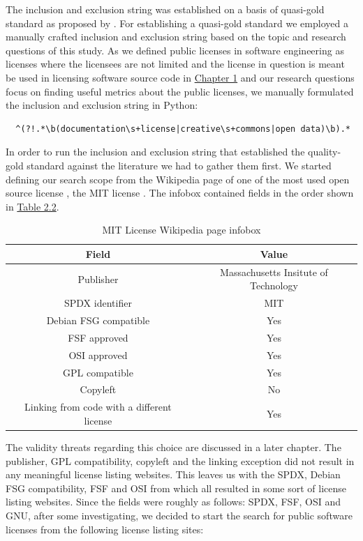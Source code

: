 The inclusion and exclusion string was established on a basis of quasi-gold standard as proposed by \cite{qgs}. For establishing a quasi-gold standard we employed a manually crafted inclusion and exclusion string based on the topic and research questions of this study. As we defined public licenses in software engineering as licenses where the licensees are not limited and the license in question is meant be used in licensing software source code in \hyperref[intro]{Chapter 1} and our research questions focus on finding useful metrics about the public licenses, we manually formulated the inclusion and exclusion string in Python:
\begin{verbatim}
  ^(?!.*\b(documentation\s+license|creative\s+commons|open data)\b).*
\end{verbatim}
In order to run the inclusion and exclusion string that established the quality-gold standard against the literature we had to gather them first. We started defining our search scope from the Wikipedia page of one of the most used open source license \citep{github:licenseusage}, the MIT license \citep{wikipedia:mit}. The infobox contained fields in the order shown in \hyperref[table:infobox]{Table 2.2}.

\begin{table}[t]
  \caption{MIT License Wikipedia page infobox}
	\begin{center}
		\begin{tabular}{||c c||}
			\hline
			Field & Value \\
			\hline
			Publisher & Massachusetts Insitute of Technology \\
			SPDX identifier & MIT \\
			Debian FSG compatible & Yes \\
			FSF approved & Yes \\
			OSI approved & 	Yes \\
			GPL compatible & Yes \\
			Copyleft & No \\
			Linking from code with a different license & Yes \\
			\hline
		\end{tabular}
		\label{table:infobox}
	\end{center}
\end{table}
The validity threats regarding this choice are discussed in a later chapter. The publisher, GPL compatibility, copyleft and the linking exception did not result in any meaningful license listing websites. This leaves us with the SPDX, Debian FSG compatibility, FSF and OSI from which all resulted in some sort of license listing websites. Since the fields were roughly as follows: SPDX, FSF, OSI and GNU, after some investigating, we decided to start the search for public software licenses from the following license listing sites:

